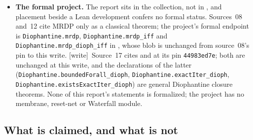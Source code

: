 \documentclass[11pt,letterpaper]{article}
\theoremstyle{definition}
\theoremstyle{remark}
\newcommand{\wtag}{\textup{[write]}}
\begin{document}
\begin{itemize}
\item \textbf{The formal project.} The report sits in the collection, not in , and placement beside a Lean development confers no formal status. Sources~08 and~12 cite MRDP only as a classical theorem; the project's formal endpoint is \texttt{Diophantine.mrdp}, \texttt{Diophantine.mrdp\_iff} and \texttt{Diophantine.mrdp\_dioph\_iff} in , whose blob is unchanged from source~08's pin to this write. \wtag\ Source~17 cites  and  at its pin \texttt{44983ed7e}; both are unchanged at this write, and the declarations of the latter (\texttt{Diophantine.boundedForall\_dioph}, \texttt{Diophantine.exactIter\_dioph}, \texttt{Diophantine.existsExactIter\_dioph}) are general Diophantine closure theorems. None of this report's statements is formalized; the project has no membrane, reset-net or Waterfall module.
\end{itemize}

\subsection{What is claimed, and what is not}\label{qoc:sec:status}
\end{document}

